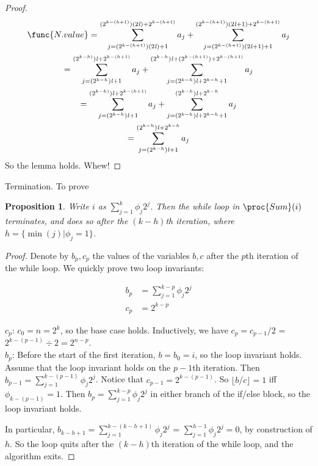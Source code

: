 \documentclass[11pt, answers]{exam}
\theoremstyle{plain}
\newtheorem{proposition}{Proposition}
\theoremstyle{definition}
\begin{document}
\begin{questions}
\begin{parts}
\begin{solution}
\begin{proof}
\begin{gather*}
\func{N.value} = 
\sum_{j = (2^{k-(h+1)})(2 \mathit{l}) + 1}^{(2^{k-(h+1)})(2 \mathit{l}) + 2^{k-(h+1)}}a_j + 
\sum_{j = (2^{k-(h+1)})(2 \mathit{l} + 1) + 1}^{(2^{k-(h+1)})(2 \mathit{l} + 1) + 2^{k-(h + 1)}}a_j \\
= \sum_{j = (2^{k-h}) \mathit{l} + 1}^{(2^{k-h)})\mathit{l} + 2^{k-(h+1)}}a_j + 
\sum_{j = (2^{k-h})\mathit{l} + 2^{k-h} + 1}^{(2^{k-h}) \mathit{l} + (2^{k-(h + 1)}) + 2^{k-(h + 1)}}a_j \\
= \sum_{j = (2^{k-h}) \mathit{l} + 1}^{(2^{k-h)})\mathit{l} + 2^{k-(h+1)}}a_j + 
\sum_{j = (2^{k-h})\mathit{l} + 2^{k-h} + 1}^{(2^{k-h}) \mathit{l} + 2^{k-h}}a_j \\
= \sum_{j = (2^{k-h})\mathit{l} + 1}^{(2^{k-h})\mathit{l} + 2^{k-h}}a_j
\end{gather*}
So the lemma holds. Whew!
\end{proof}


Termination. To prove 

\begin{proposition}
Write $i$ as $\sum_{j = 1}^{k}\phi_j 2^j$. Then the while loop in $\proc{Sum}(i)$ terminates, and does so after the $(k-h)$th iteration, where $h = \{\min(j) | \phi_j = 1\}$. 
\end{proposition}

\begin{proof}
Denote by $b_p, c_p$ the values of the variables $b,c$ after the $p$th iteration of the while loop. We quickly prove two loop invariants:

\begin{align*}
b_p &=  \sum_{j = 1}^{k-p}\phi_j 2^j \\
c_p &=  2^{k-p}
\end{align*}

$c_p$: $c_0 = n = 2^k$, so the base case holds. Inductively, we have $c_p = c_{p-1} / 2$ = $2^{k-(p-1)} \div 2 = 2^{n-p}$. \\

$b_p$: Before the start of the first iteration, $b = b_0 = i$, so the loop invariant holds. 
Assume that the loop invariant holds on the $p-1$th iteration. Then $b_{p-1} = \sum_{j = 1}^{k-(p-1)}\phi_j 2^j$. Notice that $c_{p-1} =  2^{k-(p-1)}$. So $\lfloor b/c \rfloor = 1$ iff $\phi_{k-(p-1)} = 1$. Then $b_p =\sum_{j = 1}^{k-p}\phi_j 2^j$ in either branch of the if/else block, so the loop invariant holds.

In particular, $b_{k-h +1} = \sum_{j = 1}^{k-(k-h+1)}\phi_j 2^j$ = $\sum_{j = 1}^{h-1}\phi_j 2^j = 0$, by construction of $h$. So the loop quits after the $(k-h)$th iteration of the while loop, and the algorithm exits.
 

\end{proof}
\end{solution}
\end{parts}
\end{questions}
\end{document}
